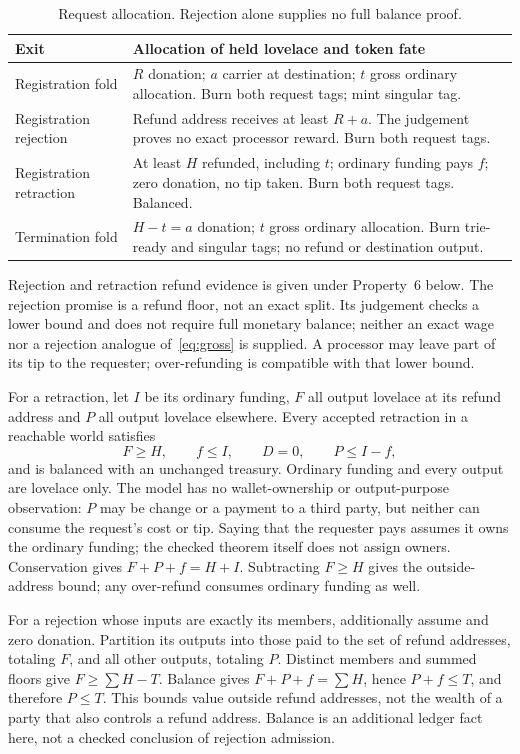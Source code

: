\begin{table}[ht]
\caption{Request allocation. Rejection alone supplies no full balance proof.}
\centering\small
\begin{tabular}{p{.24\linewidth}p{.64\linewidth}}\toprule
Exit & Allocation of held lovelace and token fate\\\midrule
Registration fold & $R$ donation; $a$ carrier at destination; $t$ gross ordinary allocation. Burn both request tags; mint singular tag.\\
Registration rejection & Refund address receives at least $R+a$. The judgement proves no exact processor reward. Burn both request tags.\\
Registration retraction & At least $H$ refunded, including $t$; ordinary funding pays $f$; zero donation, no tip taken. Burn both request tags. Balanced.\\
Termination fold & $H-t=a$ donation; $t$ gross ordinary allocation. Burn trie-ready and singular tags; no refund or destination output.\\\bottomrule
\end{tabular}
\end{table}
Rejection and retraction refund evidence is given under Property~6 below.
The rejection promise is a refund floor, not an exact split. Its judgement
checks a lower bound and does not require full monetary
balance; neither an exact wage nor a rejection analogue of~\eqref{eq:gross}
is supplied. A processor may leave part of its tip to the requester;
over-refunding is compatible with that lower bound.

\checked For a retraction, let $I$ be its ordinary funding, $F$ all output
lovelace at its refund address and $P$ all output lovelace elsewhere. Every
accepted retraction in a reachable world satisfies
\[
 F\ge H,\qquad f\le I,\qquad D=0,\qquad P\le I-f,
\]
and is balanced with an unchanged treasury. Ordinary funding and every output
are lovelace only. The model has no wallet-ownership or output-purpose
observation: $P$ may be change or a payment to a third party, but neither can
consume the request's cost or tip. Saying that the requester pays assumes it
owns the ordinary funding; the checked theorem itself does not assign owners.
\hand Conservation gives $F+P+f=H+I$. Subtracting $F\ge H$ gives the
outside-address bound; any over-refund consumes ordinary funding as well.

\hand For a rejection whose inputs are exactly its members, additionally
assume  and zero donation. Partition its outputs into
those paid to the set of refund addresses, totaling $F$, and all other outputs,
totaling $P$. Distinct members and summed floors give $F\ge\sum H-T$.
Balance gives $F+P+f=\sum H$, hence $P+f\le T$, and therefore $P\le T$.
This bounds value outside refund addresses, not the wealth of a party that
also controls a refund address. Balance is an additional ledger fact here,
not a checked conclusion of rejection admission.

